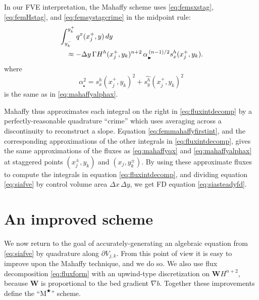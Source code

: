 \documentclass[twocolumn,letterpaper]{igs}
\newcommand\bW{\mathbf{W}}
\newcommand{\grad}{\nabla}
\newcommand{\Mstar}{$\text{M}^{\bigstar}$\xspace}
\newcommand\alpharight{\alpha_{{}_{\blacktriangleright}}}
\begin{document}
In our FVE interpretation, the Mahaffy scheme uses \eqref{eq:femsxstag}, \eqref{eq:femHstag}, and \eqref{eq:femsystagcrime} in the midpoint rule:
\begin{align}
&\int_{y_k^-}^{y_k^+} q^x(x_j^+,y)\,dy  \label{eq:femmahaffyfirstint} \\
  &\quad\approx - \Delta y\, \Gamma H^h(x_j^+,y_k)^{n+2} \,\alpharight^{\,(n-1)/2} s^h_x(x_j^+,y_k). \notag 
\end{align}
where
\begin{equation}
\alpharight^2 = s^h_x(x_j^+,y_k)^2 + \widehat{s^h_y}(x_j^+,y_k)^2
\end{equation}
is the same as in \eqref{eq:mahaffyalphax}.

Mahaffy thus approximates each integral on the right in \eqref{eq:fluxintdecomp} by a perfectly-reasonable quadrature ``crime'' \citep[compare][]{Strang1972} which uses averaging across a discontinuity to reconstruct a slope.  Equation \eqref{eq:femmahaffyfirstint}, and the corresponding approximations of the other integrals in \eqref{eq:fluxintdecomp}, gives the same approximations of the fluxes as \eqref{eq:mahaffyqx} and \eqref{eq:mahaffyalphax} at staggered points $(x_j^\pm,y_k)$ and $(x_j,y_k^\pm)$.  By using these approximate fluxes to compute the integrals in equation \eqref{eq:fluxintdecomp}, and dividing equation \eqref{eq:siafve} by control volume area $\Delta x\,\Delta y$, we get FD equation \eqref{eq:siasteadyfd}.


\section{An improved scheme}  \label{sec:star}

We now return to the goal of accurately-generating an algebraic equation from \eqref{eq:siafve} by quadrature along $\partial V_{j,k}$.  From this point of view it is easy to improve upon the Mahaffy technique, and we do so.  We also use flux decomposition \eqref{eq:fluxform} with an upwind-type discretization on $\bW H^{n+2}$, because $\bW$ is proportional to the bed gradient $\grad b$.  Together these improvements define the ``\Mstar'' scheme.
\end{document}

